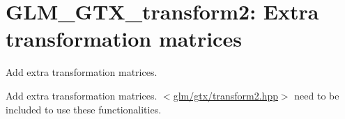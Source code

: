 \hypertarget{group__gtx__transform2}{\section{\-G\-L\-M\-\_\-\-G\-T\-X\-\_\-transform2\-: \-Extra transformation matrices}
\label{group__gtx__transform2}
}


\-Add extra transformation matrices.  


\-Add extra transformation matrices. $<$\hyperlink{transform2_8hpp}{glm/gtx/transform2.\-hpp}$>$ need to be included to use these functionalities. 